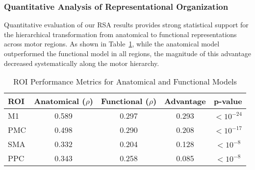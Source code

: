 \documentclass{article}
\begin{document}



\subsubsection{Quantitative Analysis of Representational Organization}

Quantitative evaluation of our RSA results provides strong statistical support for the hierarchical transformation from anatomical to functional representations across motor regions. As shown in Table~\ref{tab:roi_metrics}, while the anatomical model outperformed the functional model in all regions, the magnitude of this advantage decreased systematically along the motor hierarchy.

\begin{table}[h]
\centering
\caption{ROI Performance Metrics for Anatomical and Functional Models}
\label{tab:roi_metrics}
\begin{tabular}{|l|c|c|c|c|}
\hline
\textbf{ROI} & \textbf{Anatomical ($\rho$)} & \textbf{Functional ($\rho$)} & \textbf{Advantage} & \textbf{p-value} \\
\hline
M1 & 0.589 & 0.297 & 0.293 & $< 10^{-24}$ \\
PMC & 0.498 & 0.290 & 0.208 & $< 10^{-17}$ \\
SMA & 0.332 & 0.204 & 0.128 & $< 10^{-8}$ \\
PPC & 0.343 & 0.258 & 0.085 & $< 10^{-8}$ \\
\hline
\end{tabular}
\end{table}
\end{document}
